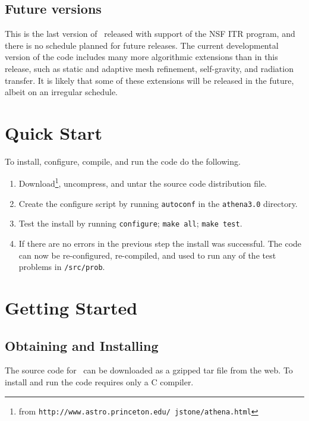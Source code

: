 \subsection{Future versions}

This is the last version of \ath\ released with support of the NSF
ITR program, and there is no schedule planned for future releases.
The current developmental version of the code includes many more
algorithmic extensions than in this release, such as static and
adaptive mesh refinement, self-gravity, and radiation transfer.
It is likely that some of these extensions will be released in the future,
albeit on an irregular schedule.

\section{Quick Start}

To install, configure, compile, and run the code do the following.
\begin{enumerate}

\item Download\footnote{from {\tt http://www.astro.princeton.edu/~jstone/athena.html}}, uncompress, and untar the source code distribution file.

\item Create the configure script by running {\tt autoconf} in the
{\tt athena3.0} directory.

\item Test the install by running {\tt configure}; {\tt make all};
{\tt make test}.

\item If there are no errors in the previous step the install was
successful.  The code can now be re-configured, re-compiled, and used to run any
of the test problems in {\tt /src/prob}.

\end{enumerate}

\section{Getting Started}

\subsection{Obtaining and Installing \ath}

The source code for \ath\ can be downloaded as a gzipped tar file from the
web.  To install and run the code requires only a C compiler.

